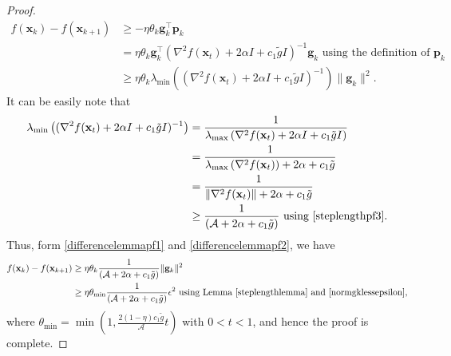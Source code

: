 \documentclass{elsarticle}
\numberwithin{equation}{section}
\begin{document}
{\begin{proof}
\begin{align}
        f(\mathbf{x}_{k})-f(\mathbf{x}_{k+1})&\geq -\eta\theta_{k}\mathbf{g}^{\top}_{k}\mathbf{p}_{k}\nonumber\\
                        & = \eta\theta_{k}\mathbf{g}^{\top}_{k}(\nabla^{2} f(\mathbf{x}_{t})+2\alpha I+c_1\tilde gI)^{-1}\mathbf{g}_k\text{ using the definition of }\mathbf{p}_{k}\nonumber\\
                        &\geq \eta \theta_{k}  \lambda_{\min}\left((\nabla^{2} f(\mathbf{x}_{t})+2\alpha I+c_1\tilde gI)^{-1}\right)\lVert \mathbf{g}_k\rVert^{2}.
    \end{align}
    It can be easily note that
    \begin{align}\label{differencelemmapf2}
        \lambda_{\min}\left((\nabla^{2} f(\mathbf{x}_{t})+2\alpha I+c_1\tilde gI)^{-1}\right)&=\frac{1}{\lambda_{\max}\left(\nabla^{2} f(\mathbf{x}_{t})+2\alpha I+c_1\tilde gI\right)}\nonumber\\
        &=\frac{1}{\lambda_{\max}\left(\nabla^{2} f(\mathbf{x}_{t})\right)+2\alpha+c_1\tilde g}\nonumber\\
        &=\frac{1}{\lVert\nabla^{2} f(\mathbf{x}_{t})\rVert+2\alpha+c_1\tilde g}\nonumber\\
        &\geq \frac{1}{(\mathcal{A}+2\alpha+c_1\tilde{g})} \text{ using }\eqref{steplengthpf3}.
    \end{align}
    Thus, form \eqref{differencelemmapf1} and \eqref{differencelemmapf2}, we have 
    \begin{align*}
        f(\mathbf{x}_{k})-f(\mathbf{x}_{k+1})&\geq \eta\theta_{k}\frac{1}{(\mathcal{A}+2\alpha+c_1\tilde{g})}\lVert \mathbf{g}_k\rVert^{2}\\
        &\geq \eta\theta_{\min}\frac{1}{(\mathcal{A}+2\alpha+c_1\tilde{g})}\epsilon^{2} \text{ using Lemma }\ref{steplengthlemma} \text{ and } \eqref{normgklessepsilon},
    \end{align*}
    where $\theta_{\min}= \min\left(1,\frac{2(1-\eta)c_1\tilde{g}}{\mathcal{A}}{t}\right)$ with $0<t<1$, and hence the proof is complete.
\end{proof}

}
\end{document}
